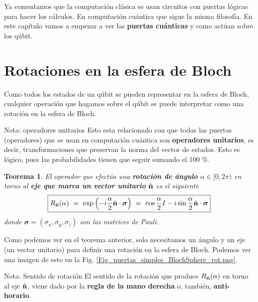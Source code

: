 \documentclass[a4paper,11pt]{book} %
\newtheorem{teorema_contador}{Teorema}
\newcommand{\Teorema}[1]{
		\begin{mybox_gray2}{}
			\begin{teorema_contador}
				 #1 
			\end{teorema_contador} 
		\end{mybox_gray2}
	}
\numberwithin{equation}{chapter}
\begin{document}
	Ya comentamos que la computación clásica se usan circuitos con puertas lógicas para hacer los cálculos. En computación cuántica que sigue la misma filosofía. En este capítulo vamos a empezar a ver las \textbf{puertas cuánticas} y como actúan sobre los qúbit.
	 
    \section{Rotaciones en la esfera de Bloch}

Como todos los estados de un qúbit se pueden representar en la esfera de Bloch, cualquier operación que hagamos sobre el qúbit se puede interpretar como una rotación en la esfera de Bloch.

	\begin{mybox_blue}{Nota: operadores unitarios}
	Esto esta relacionado con que todas las puertas (operadores) que se usan en computación cuántica son 
	\textbf{operadores unitarios}, es decir, transformaciones que preservan la norma
	del vector de estados. Esto es lógico, pues las probabilidades tienen que seguir 
	sumando el 100 \%. 
	\end{mybox_blue}
	

	\Teorema{
	El operador que efectúa una \textbf{rotación de ángulo}  $\alpha\in [0,2\pi)$ en torno al 
	\textbf{eje que marca un vector unitario} $\hat{\bf n}$ es el siguiente
	\begin{equation} \label{ec_puertas_simples_Rn}
	\boxed{R_{\hat{\bf n}}(\alpha)~ = ~\exp\left( -i\frac{\alpha}{2} \hat{\bf n}\cdot 
	\boldsymbol{\sigma} \right) ~=~ \cos \frac{\alpha}{2} I - i \sin\frac{\alpha}{2} 
	\hat{\bf n}\cdot\boldsymbol{\sigma} }
	\end{equation}
	donde $\boldsymbol{\sigma} = (\sigma_x, \sigma_y, \sigma_z)$ son las matrices de Pauli.
	}
	
Como podemos ver en el teorema anterior, solo necesitamos un ángulo y un eje (un vector unitario) para definir una rotación en la esfera de Bloch. Podemos ver una imagen de esto en la Fig. \ref{Fig_puertas_simples_BlochSphere_rot.png}. 


	\begin{mybox_blue}{Nota: Sentido de rotación}
	El sentido de la rotación que produce $R_{\hat{\bf n}}(\alpha)$ en torno al eje 
	$\hat{\bf n}$, viene dado por la \textbf{regla de la mano derecha} o, también, 
	\textbf{anti-horario}. 
	\end{mybox_blue}
\end{document}
